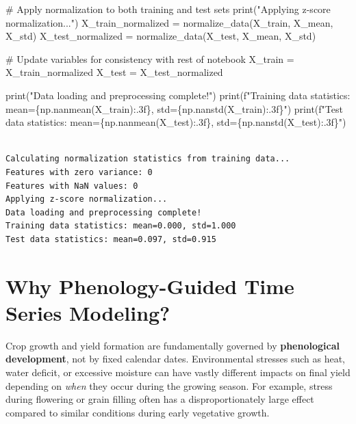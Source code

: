 \documentclass[
  letterpaper,
  DIV=11,
  numbers=noendperiod]{scrreprt}
\newenvironment{Shaded}{\begin{snugshade}}{\end{snugshade}}
\newcommand{\BuiltInTok}[1]{\textcolor[rgb]{0.00,0.23,0.31}{#1}}
\newcommand{\CommentTok}[1]{\textcolor[rgb]{0.37,0.37,0.37}{#1}}
\newcommand{\NormalTok}[1]{\textcolor[rgb]{0.00,0.23,0.31}{#1}}
\newcommand{\OperatorTok}[1]{\textcolor[rgb]{0.37,0.37,0.37}{#1}}
\newcommand{\SpecialCharTok}[1]{\textcolor[rgb]{0.37,0.37,0.37}{#1}}
\newcommand{\SpecialStringTok}[1]{\textcolor[rgb]{0.13,0.47,0.30}{#1}}
\newcommand{\StringTok}[1]{\textcolor[rgb]{0.13,0.47,0.30}{#1}}
\begin{document}
\begin{Shaded}
\begin{Highlighting}[]
\CommentTok{\# Apply normalization to both training and test sets}
\BuiltInTok{print}\NormalTok{(}\StringTok{"Applying z{-}score normalization..."}\NormalTok{)}
\NormalTok{X\_train\_normalized }\OperatorTok{=}\NormalTok{ normalize\_data(X\_train, X\_mean, X\_std)}
\NormalTok{X\_test\_normalized }\OperatorTok{=}\NormalTok{ normalize\_data(X\_test, X\_mean, X\_std)}

\CommentTok{\# Update variables for consistency with rest of notebook}
\NormalTok{X\_train }\OperatorTok{=}\NormalTok{ X\_train\_normalized}
\NormalTok{X\_test }\OperatorTok{=}\NormalTok{ X\_test\_normalized}

\BuiltInTok{print}\NormalTok{(}\StringTok{"Data loading and preprocessing complete!"}\NormalTok{)}
\BuiltInTok{print}\NormalTok{(}\SpecialStringTok{f"Training data statistics: mean=}\SpecialCharTok{\{}\NormalTok{np}\SpecialCharTok{.}\NormalTok{nanmean(X\_train)}\SpecialCharTok{:.3f\}}\SpecialStringTok{, std=}\SpecialCharTok{\{}\NormalTok{np}\SpecialCharTok{.}\NormalTok{nanstd(X\_train)}\SpecialCharTok{:.3f\}}\SpecialStringTok{"}\NormalTok{)}
\BuiltInTok{print}\NormalTok{(}\SpecialStringTok{f"Test data statistics: mean=}\SpecialCharTok{\{}\NormalTok{np}\SpecialCharTok{.}\NormalTok{nanmean(X\_test)}\SpecialCharTok{:.3f\}}\SpecialStringTok{, std=}\SpecialCharTok{\{}\NormalTok{np}\SpecialCharTok{.}\NormalTok{nanstd(X\_test)}\SpecialCharTok{:.3f\}}\SpecialStringTok{"}\NormalTok{)}
\end{Highlighting}
\end{Shaded}

\begin{verbatim}

Calculating normalization statistics from training data...
Features with zero variance: 0
Features with NaN values: 0
Applying z-score normalization...
Data loading and preprocessing complete!
Training data statistics: mean=0.000, std=1.000
Test data statistics: mean=0.097, std=0.915
\end{verbatim}

\section{Why Phenology-Guided Time Series
Modeling?}\label{why-phenology-guided-time-series-modeling}

Crop growth and yield formation are fundamentally governed by
\textbf{phenological development}, not by fixed calendar dates.
Environmental stresses such as heat, water deficit, or excessive
moisture can have vastly different impacts on final yield depending on
\emph{when} they occur during the growing season. For example, stress
during flowering or grain filling often has a disproportionately large
effect compared to similar conditions during early vegetative growth.
\end{document}
